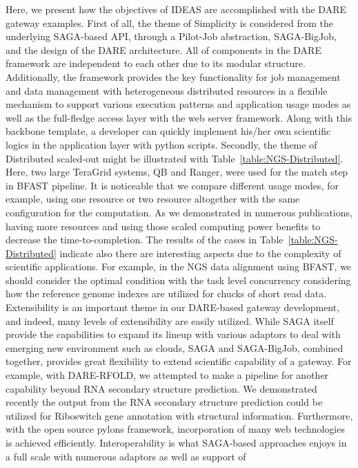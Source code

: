 \documentclass{sig-alternate}
\begin{document}
  
  Here, we present how the objectives of IDEAS\cite{ideas} are
accomplished with the DARE gateway examples.  First of all, the theme
of Simplicity is considered from the underlying SAGA-based API,
through a Pilot-Job abstraction, SAGA-BigJob, and the design of the
DARE architecture.  All of components in the DARE framework are
independent to each other due to its modular structure.  Additionally,
the framework provides the key functionality for job management and
data management with heterogeneous distributed resources in a flexible
mechanism to support various execution patterns and application usage
modes as well as the full-fledge access layer with the web server
framework.  Along with this backbone template, a developer can quickly
implement his/her own scientific logics in the application layer with
python scripts.  Secondly, the theme of Distributed scaled-out might
be illustrated with Table~\ref{table:NGS-Distributed}.  Here, two
large TeraGrid systems, QB and Ranger, were used for the match step in
BFAST pipeline.  It is noticeable that we compare different usage
modes, for example, using one resource or two resource altogether with
the same configuration for the computation.  As we demonstrated in
numerous publications, having more resources and using those scaled
computing power benefits to decrease the time-to-completion.  The
results of the cases in Table~\ref{table:NGS-Distributed} indicate
also there are interesting aspects due to the complexity of scientific
applications.  For example, in the NGS data alignment using BFAST, we
should consider the optimal condition with the task level concurrency
considering how the reference genome indexes are utilized for chucks
of short read data\cite{ecmls11}.  Extensibility is an important theme
in our DARE-based gateway development, and indeed, many levels of
extensibility are easily utilized.  While SAGA itself provide the
capabilities to expand its lineup with various adaptors to deal with
emerging new environment such as clouds, SAGA and SAGA-BigJob,
combined together, provides great flexibility to extend scientific
capability of a gateway. For example, with DARE-RFOLD, we attempted to
make a pipeline for another capability beyond RNA secondary structure
prediction.  We demonstrated recently the output from the RNA
secondary structure prediction could be utilized for Riboswitch gene
annotation with structural information.  Furthermore, with the open
source pylons framework, incorporation of many web technologies is
achieved efficiently.  Interoperability is what SAGA-based approaches
enjoys in a full scale with numerous adaptors as well as support of
\end{document}
